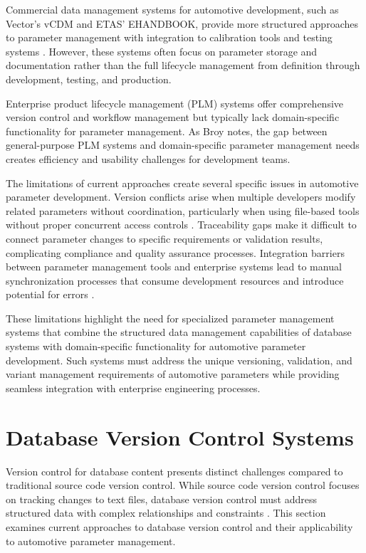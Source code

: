 Commercial data management systems for automotive development, such as Vector's vCDM and ETAS' EHANDBOOK, provide more structured approaches to parameter management with integration to calibration tools and testing systems \cite{staron2021automotive}. However, these systems often focus on parameter storage and documentation rather than the full lifecycle management from definition through development, testing, and production.

Enterprise product lifecycle management (PLM) systems offer comprehensive version control and workflow management but typically lack domain-specific functionality for parameter management. As Broy \cite{broy2006challenges} notes, the gap between general-purpose PLM systems and domain-specific parameter management needs creates efficiency and usability challenges for development teams.

The limitations of current approaches create several specific issues in automotive parameter development. Version conflicts arise when multiple developers modify related parameters without coordination, particularly when using file-based tools without proper concurrent access controls \cite{pretschner2007software}. Traceability gaps make it difficult to connect parameter changes to specific requirements or validation results, complicating compliance and quality assurance processes. Integration barriers between parameter management tools and enterprise systems lead to manual synchronization processes that consume development resources and introduce potential for errors \cite{staron2021automotive}.

These limitations highlight the need for specialized parameter management systems that combine the structured data management capabilities of database systems with domain-specific functionality for automotive parameter development. Such systems must address the unique versioning, validation, and variant management requirements of automotive parameters while providing seamless integration with enterprise engineering processes.

\section{Database Version Control Systems}
\label{sec:database-version-control}

Version control for database content presents distinct challenges compared to traditional source code version control. While source code version control focuses on tracking changes to text files, database version control must address structured data with complex relationships and constraints \cite{bhattacherjee2015principles}. This section examines current approaches to database version control and their applicability to automotive parameter management.

